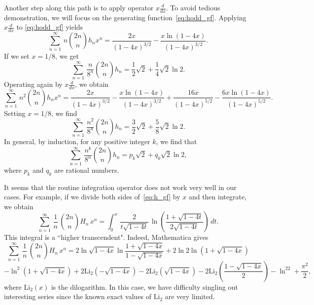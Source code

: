 \documentclass[12pt,reqno]{article}
\begin{document}
Another step along this path is to apply operator $x\frac{d}{dx}$. To avoid tedious demonstration, we will focus on the generating function~\eqref{eq:hodd_gf}. Applying $x\frac{d}{dx}$ to
\eqref{eq:hodd_gf} yields
$$\sum_{n=1}^\infty\,n{2n \choose n}h_nx^n = \frac{2x}{(1-4x)^{3/2}} - \frac{x\ln(1-4x)}{(1-4x)^{3/2}}.$$
If we set $x = 1/8$, we get
$$\sum_{n=1}^\infty\,\frac{n}{8^n}{2n \choose n}h_n = \frac{1}{2}\sqrt{2} +\frac{1}{4}\sqrt{2} \ln 2.$$
Operating again by $x\frac{d}{dx}$, we obtain
$$\sum_{n=1}^\infty\,n^2{2n \choose n}h_nx^n =  \frac{2x}{(1-4x)^{3/2}} - \frac{x\ln(1-4x)}{(1-4x)^{3/2}} + 
\frac{16x}{(1-4x)^{5/2}} - \frac{6x\ln(1-4x)}{(1-4x)^{5/2}}.$$
Setting $x = 1/8$, we find
$$\sum_{n=1}^\infty\,\frac{n^2}{8^n}{2n \choose n}h_n = \frac{3}{2}\sqrt{2} +\frac{5}{8}\sqrt{2} \ln 2.$$
In general, by induction, for any positive integer $k$, we find that
$$\sum_{n=1}^\infty\,\frac{n^k}{8^n}{2n \choose n}h_n = p_k\sqrt{2} + q_k\sqrt{2}\ln 2,$$
where $p_k$ and $q_k$ are rational numbers.

It seems that the routine integration operator does not work very well in our cases. For example, if we divide both sides of~\eqref{eq:h_gf} by $x$ and then integrate, we obtain
$$\sum_{n=1}^\infty\,\frac{1}{n}\,\binom{2n}{n}H_n\,x^n =\int_0^x\, \frac{2}{t\sqrt{1-4t}}\,\ln\left(\frac{1+\sqrt{1 -4t}}{2\sqrt{1-4t}}\right)\,dt.$$
This integral is a ``higher transcendent". Indeed, Mathematica gives
$$\sum_{n=1}^\infty\,\frac{1}{n}\,\binom{2n}{n}H_n\,x^n = 2\ln\sqrt{1-4x}\ln\frac{1+ \sqrt{1-4x}}{1-\sqrt{1-4x}} + 2\ln 2\ln(1 + \sqrt{1-4x}) $$
$$-\ln^2(1+ \sqrt{1-4x}) + 2\mbox{Li}_2(-\sqrt{1-4x}) - 2\mbox{Li}_2(\sqrt{1-4x}) - 2\mbox{Li}_2\left(\frac{1-\sqrt{1-4x}}{2}\right) - \ln^22 + \frac{\pi^2}{2},$$
where $\mbox{Li}_2(x)$ is the dilogarithm. In this case, we have difficulty singling out interesting series since the known exact values of $\mbox{Li}_2$ are very limited.
\end{document}

